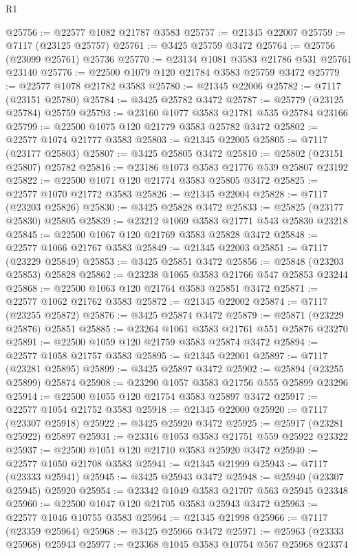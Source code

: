 \begin{lexlean}{R1}
\begin{coremodule}
@25756 := @22577 @1082 @21787 @3583
@25757 := @21345 @22007
@25759 := @7117 (@23125 @25757)
@25761 := @3425 @25759 @3472
@25764 := @25756 (@23099 @25761) @25736
@25770 := @23134 @1081 @3583 @21786 @531 @25761 @23140
@25776 := @22500 @1079 @120 @21784 @3583 @25759 @3472
@25779 := @22577 @1078 @21782 @3583
@25780 := @21345 @22006
@25782 := @7117 (@23151 @25780)
@25784 := @3425 @25782 @3472
@25787 := @25779 (@23125 @25784) @25759
@25793 := @23160 @1077 @3583 @21781 @535 @25784 @23166
@25799 := @22500 @1075 @120 @21779 @3583 @25782 @3472
@25802 := @22577 @1074 @21777 @3583
@25803 := @21345 @22005
@25805 := @7117 (@23177 @25803)
@25807 := @3425 @25805 @3472
@25810 := @25802 (@23151 @25807) @25782
@25816 := @23186 @1073 @3583 @21776 @539 @25807 @23192
@25822 := @22500 @1071 @120 @21774 @3583 @25805 @3472
@25825 := @22577 @1070 @21772 @3583
@25826 := @21345 @22004
@25828 := @7117 (@23203 @25826)
@25830 := @3425 @25828 @3472
@25833 := @25825 (@23177 @25830) @25805
@25839 := @23212 @1069 @3583 @21771 @543 @25830 @23218
@25845 := @22500 @1067 @120 @21769 @3583 @25828 @3472
@25848 := @22577 @1066 @21767 @3583
@25849 := @21345 @22003
@25851 := @7117 (@23229 @25849)
@25853 := @3425 @25851 @3472
@25856 := @25848 (@23203 @25853) @25828
@25862 := @23238 @1065 @3583 @21766 @547 @25853 @23244
@25868 := @22500 @1063 @120 @21764 @3583 @25851 @3472
@25871 := @22577 @1062 @21762 @3583
@25872 := @21345 @22002
@25874 := @7117 (@23255 @25872)
@25876 := @3425 @25874 @3472
@25879 := @25871 (@23229 @25876) @25851
@25885 := @23264 @1061 @3583 @21761 @551 @25876 @23270
@25891 := @22500 @1059 @120 @21759 @3583 @25874 @3472
@25894 := @22577 @1058 @21757 @3583
@25895 := @21345 @22001
@25897 := @7117 (@23281 @25895)
@25899 := @3425 @25897 @3472
@25902 := @25894 (@23255 @25899) @25874
@25908 := @23290 @1057 @3583 @21756 @555 @25899 @23296
@25914 := @22500 @1055 @120 @21754 @3583 @25897 @3472
@25917 := @22577 @1054 @21752 @3583
@25918 := @21345 @22000
@25920 := @7117 (@23307 @25918)
@25922 := @3425 @25920 @3472
@25925 := @25917 (@23281 @25922) @25897
@25931 := @23316 @1053 @3583 @21751 @559 @25922 @23322
@25937 := @22500 @1051 @120 @21710 @3583 @25920 @3472
@25940 := @22577 @1050 @21708 @3583
@25941 := @21345 @21999
@25943 := @7117 (@23333 @25941)
@25945 := @3425 @25943 @3472
@25948 := @25940 (@23307 @25945) @25920
@25954 := @23342 @1049 @3583 @21707 @563 @25945 @23348
@25960 := @22500 @1047 @120 @21705 @3583 @25943 @3472
@25963 := @22577 @1046 @10755 @3583
@25964 := @21345 @21998
@25966 := @7117 (@23359 @25964)
@25968 := @3425 @25966 @3472
@25971 := @25963 (@23333 @25968) @25943
@25977 := @23368 @1045 @3583 @10754 @567 @25968 @23374

\end{coremodule}
\end{lexlean}
